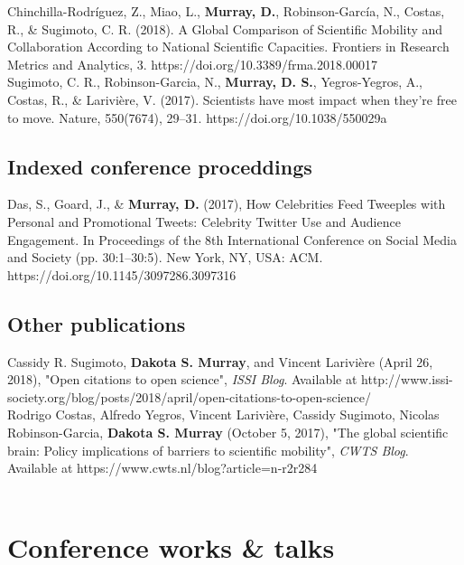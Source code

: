 \documentclass[10pt, a4paper]{article}
\newcommand{\years}[1]{\marginnote{\scriptsize #1}}
\begin{document}
\years{2018}Chinchilla-Rodríguez, Z., Miao, L., \textbf{Murray, D.}, Robinson-García, N., Costas, R., \& Sugimoto, C. R. (2018). A Global Comparison of Scientific Mobility and Collaboration According to National Scientific Capacities. Frontiers in Research Metrics and Analytics, 3. https://doi.org/10.3389/frma.2018.00017\\

\years{2017}Sugimoto, C. R., Robinson-Garcia, N., \textbf{Murray, D. S.}, Yegros-Yegros, A., Costas, R., \& Larivière, V. (2017). Scientists have most impact when they’re free to move. Nature, 550(7674), 29–31. https://doi.org/10.1038/550029a\\

\subsection*{Indexed conference proceddings}
\noindent
\years{2017}Das, S., Goard, J., \& \textbf{Murray, D.} (2017), How Celebrities Feed Tweeples with Personal and Promotional Tweets: Celebrity Twitter Use and Audience Engagement. In Proceedings of the 8th International Conference on Social Media and Society (pp. 30:1–30:5). New York, NY, USA: ACM. https://doi.org/10.1145/3097286.3097316\\

\subsection*{Other publications}
\noindent

\years{2018} Cassidy R. Sugimoto, \textbf{Dakota S. Murray}, and Vincent Larivière (April 26, 2018), "Open citations to open science", \emph{ISSI Blog}. Available at http://www.issi-society.org/blog/posts/2018/april/open-citations-to-open-science/\\

\years{2017} Rodrigo Costas, Alfredo Yegros, Vincent Larivière, Cassidy Sugimoto, Nicolas Robinson-Garcia, \textbf{Dakota S. Murray} (October 5, 2017), "The global scientific brain: Policy implications of barriers to scientific mobility", \emph{CWTS Blog}. Available at https://www.cwts.nl/blog?article=n-r2r284\\
\\

\section*{Conference works \& talks}
\end{document}
